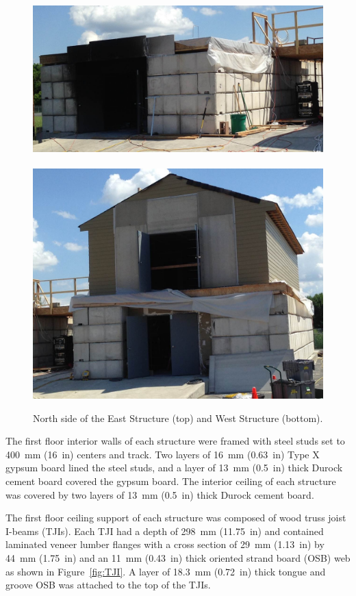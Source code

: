 \begin{figure}
	\centering
	\includegraphics[width=5.25in]{Figures/Pictures/east_structure}
	\\~\\
	\includegraphics[width=5.25in]{Figures/Pictures/west_structure}
	\caption[North side of the East and West Structures]{North side of the East Structure (top) and West Structure (bottom).}
	\label{fig:struct_pics}
\end{figure}

The first floor interior walls of each structure were framed with steel studs set to 400~mm (16~in) centers and track. Two layers of 16~mm (0.63~in) Type X gypsum board lined the steel studs, and a layer of 13~mm (0.5~in) thick Durock cement board covered the gypsum board. The interior ceiling of each structure was covered by two layers of 13~mm (0.5~in) thick Durock cement board.

The first floor ceiling support of each structure was composed of wood truss joist I-beams (TJIs). Each TJI had a depth of 298~mm (11.75~in) and contained laminated veneer lumber flanges with a cross section of 29~mm (1.13~in) by 44~mm (1.75~in) and an 11~mm (0.43~in) thick oriented strand board (OSB) web as shown in Figure~\ref{fig:TJI}. A layer of 18.3~mm (0.72~in) thick tongue and groove OSB was attached to the top of the TJIs.

